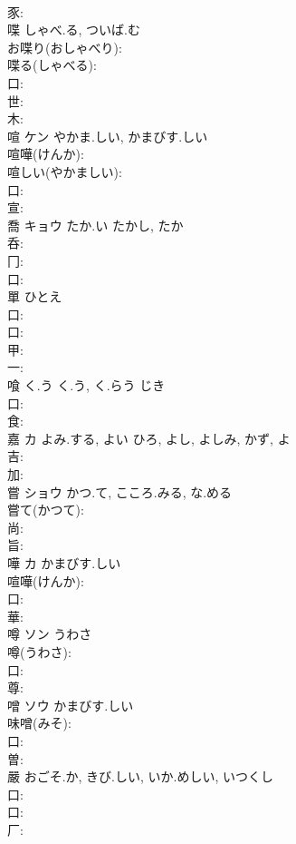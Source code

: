 \documentclass[8pt]{extreport}
\begin{document}
\begin{CJK}{UTF8}{min}
\\	豕: 
\\	喋		しゃべ.る, ついば.む			
\\	お喋り(おしゃべり): 
\\	喋る(しゃべる): 
\\	口: 
\\	世: 
\\	木: 
\\	喧	ケン	やかま.しい, かまびす.しい		
\\	喧嘩(けんか): 
\\	喧しい(やかましい): 
\\	口: 
\\	宣: 
\\	喬	キョウ	たか.い	たかし, たか	
\\	呑: 
\\	冂: 
\\	口: 
\\	單		ひとえ				
\\	口: 
\\	口: 
\\	甲: 
\\	一: 
\\	喰	く.う	く.う, く.らう	じき	
\\	口: 
\\	食: 
\\	嘉	カ	よみ.する, よい	ひろ, よし, よしみ, かず, よ	
\\	吉: 
\\	加: 
\\	嘗	ショウ	かつ.て, こころ.みる, な.める		
\\	嘗て(かつて): 
\\	尚: 
\\	旨: 
\\	嘩	カ	かまびす.しい		
\\	喧嘩(けんか): 
\\	口: 
\\	華: 
\\	噂	ソン	うわさ		
\\	噂(うわさ): 
\\	口: 
\\	尊: 
\\	噌	ソウ	かまびす.しい		
\\	味噌(みそ): 
\\	口: 
\\	曽: 
\\	嚴		おごそ.か, きび.しい, いか.めしい, いつくし				
\\	口: 
\\	口: 
\\	厂: 

\end{CJK}
\end{document}
